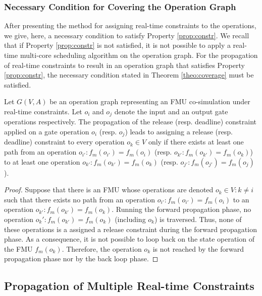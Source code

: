 \subsubsection{Necessary Condition for Covering the Operation Graph}

After presenting the method for assigning real-time constraints to the operations, we give, here, a necessary condition to satisfy Property \ref{prop:constr}. We recall that if Property \ref{prop:constr} is not satisfied, it is not possible to apply a real-time multi-core scheduling algorithm on the operation graph. For the propagation of real-time constraints to result in an operation graph that satisfies Property \ref{prop:constr}, the necessary condition stated in Theorem \ref{theo:coverage} must be satisfied.

\begin{theorem}
Let $G(V,A)$ be an operation graph representing an FMU co-simulation under real-time constraints. Let $o_i$ and $o_j$ denote the input and an output gate operations respectively. The propagation of the release (resp. deadline) constraint applied on a gate operation $o_i$ (resp. $o_j$) leads to assigning a release (resp. deadline) constraint to every operation $o_k \in V$ only if there exists at least one path from an operation $o_{i'}: f_m(o_{i'}) = f_m(o_{i})$ (resp. $o_{k'} : f_m(o_{k'}) = f_m(o_k)$) to at least one operation $o_{k'} : f_m(o_{k'}) = f_m(o_k)$ (resp. $o_{j'}: f_m(o_{j'}) = f_m(o_j)$).  
\label{theo:coverage}
\end{theorem}

\begin{proof}
Suppose that there is an FMU whose operations are denoted $o_k \in  V : k \neq i$ such that there exists no path from an operation $o_{i'}: f_m(o_{i'}) = f_m(o_{i})$ to an operation $o_{k'} : f_m(o_{k'}) = f_m(o_k)$. Running the forward propagation phase, no operation $o_k': f_m(o_{k'}) = f_m(o_k)$ (including $o_k$) is traversed. Thus, none of these operations is a assigned a release constraint during the forward propagation phase. As a consequence, it is not possible to loop back on the state operation of the FMU $f_m(o_{k})$. Therefore, the operation $o_k$ is not reached by the forward propagation phase nor by the back loop phase.
\end{proof}

\subsection{Propagation of Multiple Real-time Constraints}

